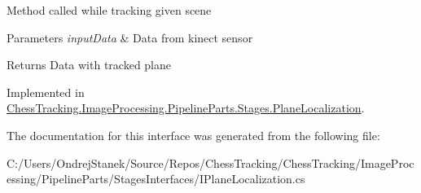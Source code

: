 Method called while tracking given scene 


\begin{DoxyParams}{Parameters}
{\em input\+Data} & Data from kinect sensor\\
\hline
\end{DoxyParams}
\begin{DoxyReturn}{Returns}
Data with tracked plane
\end{DoxyReturn}


Implemented in \mbox{\hyperlink{class_chess_tracking_1_1_image_processing_1_1_pipeline_parts_1_1_stages_1_1_plane_localization_a37055795945cfe41324cbc59e3563b2e}{Chess\+Tracking.\+Image\+Processing.\+Pipeline\+Parts.\+Stages.\+Plane\+Localization}}.



The documentation for this interface was generated from the following file\+:\begin{DoxyCompactItemize}
\item 
C\+:/\+Users/\+Ondrej\+Stanek/\+Source/\+Repos/\+Chess\+Tracking/\+Chess\+Tracking/\+Image\+Processing/\+Pipeline\+Parts/\+Stages\+Interfaces/I\+Plane\+Localization.\+cs\end{DoxyCompactItemize}
